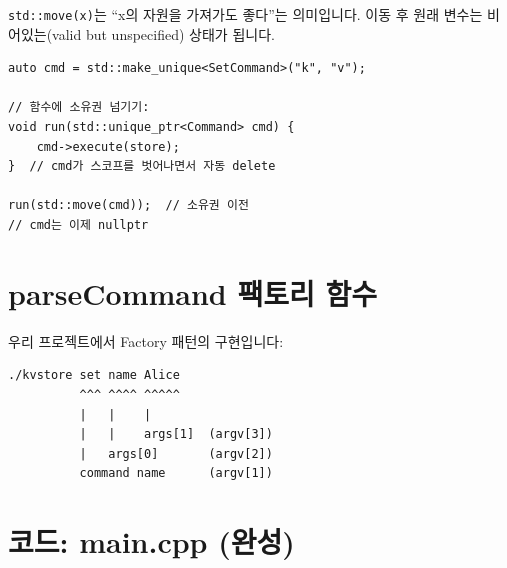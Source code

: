 \documentclass[11pt,a4paper]{book}
\newcommand{\code}[1]{\texttt{#1}}
\begin{document}
\code{std::move(x)}는 ``x의 자원을 가져가도 좋다''는 의미입니다. 이동 후 원래 변수는 비어있는(valid but unspecified) 상태가 됩니다.

\begin{lstlisting}[style=cpp]
auto cmd = std::make_unique<SetCommand>("k", "v");

// 함수에 소유권 넘기기:
void run(std::unique_ptr<Command> cmd) {
    cmd->execute(store);
}  // cmd가 스코프를 벗어나면서 자동 delete

run(std::move(cmd));  // 소유권 이전
// cmd는 이제 nullptr
\end{lstlisting}

\section{parseCommand 팩토리 함수}

우리 프로젝트에서 Factory 패턴의 구현입니다:

\begin{lstlisting}[style=shell,numbers=none]
./kvstore set name Alice
          ^^^ ^^^^ ^^^^^
          |   |    |
          |   |    args[1]  (argv[3])
          |   args[0]       (argv[2])
          command name      (argv[1])
\end{lstlisting}

\section{코드: main.cpp (완성)}
\end{document}
